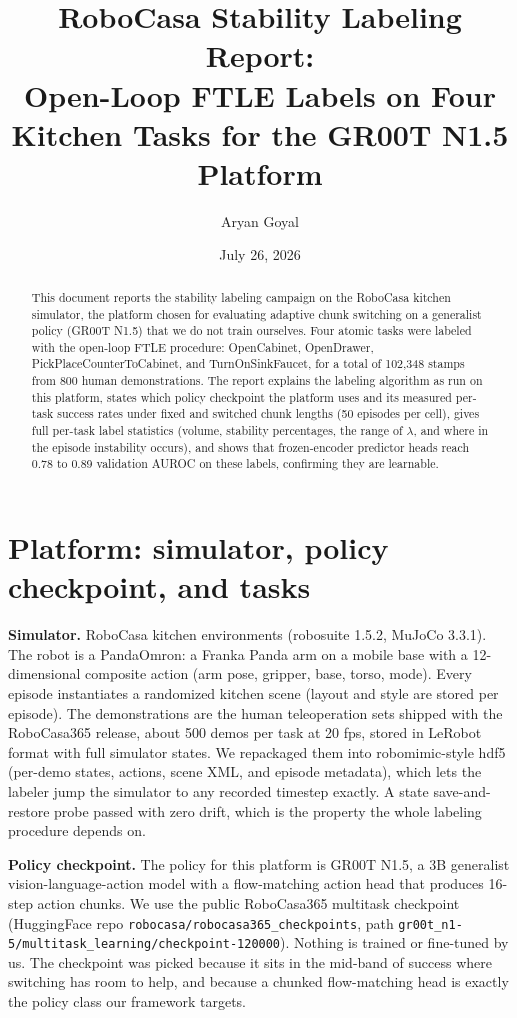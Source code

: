 \documentclass[11pt]{article}
\title{RoboCasa Stability Labeling Report:\\ \large Open-Loop FTLE Labels on Four Kitchen Tasks for the GR00T N1.5 Platform}
\author{Aryan Goyal}
\date{July 26, 2026}
\begin{document}
\maketitle

\begin{abstract}
\noindent
This document reports the stability labeling campaign on the RoboCasa kitchen
simulator, the platform chosen for evaluating adaptive chunk switching on a
generalist policy (GR00T N1.5) that we do not train ourselves. Four atomic tasks
were labeled with the open-loop FTLE procedure: OpenCabinet, OpenDrawer,
PickPlaceCounterToCabinet, and TurnOnSinkFaucet, for a total of 102{,}348 stamps
from 800 human demonstrations. The report explains the labeling algorithm as run
on this platform, states which policy checkpoint the platform uses and its
measured per-task success rates under fixed and switched chunk lengths (50
episodes per cell), gives full per-task label statistics (volume, stability
percentages, the range of $\lambda$, and where in the episode instability
occurs), and shows that frozen-encoder predictor heads reach 0.78 to 0.89
validation AUROC on these labels, confirming they are learnable.
\end{abstract}

\section{Platform: simulator, policy checkpoint, and tasks}

\textbf{Simulator.} RoboCasa kitchen environments (robosuite 1.5.2, MuJoCo
3.3.1). The robot is a PandaOmron: a Franka Panda arm on a mobile base with a
12-dimensional composite action (arm pose, gripper, base, torso, mode). Every
episode instantiates a randomized kitchen scene (layout and style are stored per
episode). The demonstrations are the human teleoperation sets shipped with the
RoboCasa365 release, about 500 demos per task at 20 fps, stored in LeRobot
format with full simulator states. We repackaged them into robomimic-style hdf5
(per-demo states, actions, scene XML, and episode metadata), which lets the
labeler jump the simulator to any recorded timestep exactly. A state
save-and-restore probe passed with zero drift, which is the property the whole
labeling procedure depends on.

\textbf{Policy checkpoint.} The policy for this platform is GR00T N1.5, a 3B
generalist vision-language-action model with a flow-matching action head that
produces 16-step action chunks. We use the public RoboCasa365 multitask
checkpoint (HuggingFace repo \texttt{robocasa/robocasa365\_checkpoints}, path
\texttt{gr00t\_n1-5/multitask\_learning/checkpoint-120000}). Nothing is trained
or fine-tuned by us. The checkpoint was picked because it sits in the mid-band
of success where switching has room to help, and because a chunked
flow-matching head is exactly the policy class our framework targets.
\end{document}
